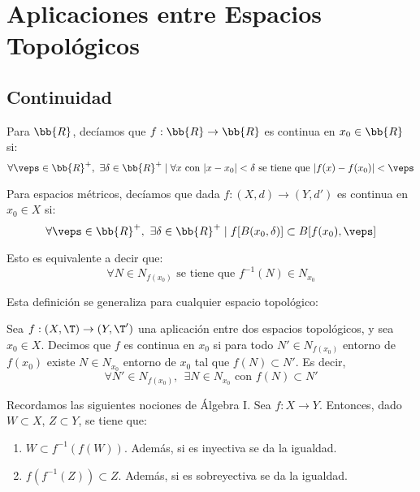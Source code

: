 \chapter{Aplicaciones entre Espacios Topológicos}

\section{Continuidad}

Para $\bb{R}$, decíamos que $f:\bb{R}\to \bb{R}$ es continua en $x_0\in \bb{R}$ si:
\begin{equation*}
    \forall \veps\in \bb{R}^+,~\exists \delta\in \bb{R}^+ \mid \forall x \text{ con } |x-x_0|<\delta \text{ se tiene que } |f(x)-f(x_0)|<\veps
\end{equation*}

Para espacios métricos, decíamos que dada $f:(X,d)\to (Y,d')$ es continua en $x_0\in X$ si:
\begin{equation*}
    \forall \veps\in \bb{R}^+,~\exists \delta\in \bb{R}^+ \mid f[B(x_0,\delta)]\subset B[f(x_0),\veps]
\end{equation*}

Esto es equivalente a decir que:
\begin{equation*}
    \forall N\in N_{f(x_0)} \text{ se tiene que } f^{-1}(N)\in N_{x_0}
\end{equation*}


Esta definición se generaliza para cualquier espacio topológico:
\begin{definicion}[Continuidad]
    Sea $f:(X,\T)\to (Y,\T')$ una aplicación entre dos espacios topológicos, y sea $x_0\in X$. Decimos que $f$ es continua en $x_0$ si para todo $N'\in N_{f(x_0)}$ entorno de $f(x_0)$ existe $N\in N_{x_0}$ entorno de $x_0$ tal que $f(N)\subset N'$. Es decir,
    \begin{equation*}
        \forall N'\in N_{f(x_0)},~~\exists N\in N_{x_0} \text{ con } f(N)\subset N'
    \end{equation*}
\end{definicion}

\begin{observacion}
    Recordamos las siguientes nociones de Álgebra I. Sea $f:X\to Y$. Entonces, dado $W\subset X$, $Z\subset Y$, se tiene que:
    \begin{enumerate}
        \item $W\subset f^{-1}(f(W))$. Además, si es inyectiva se da la igualdad.

        \item $f(f^{-1}(Z))\subset Z$. Además, si es sobreyectiva se da la igualdad.
    \end{enumerate}
\end{observacion}


